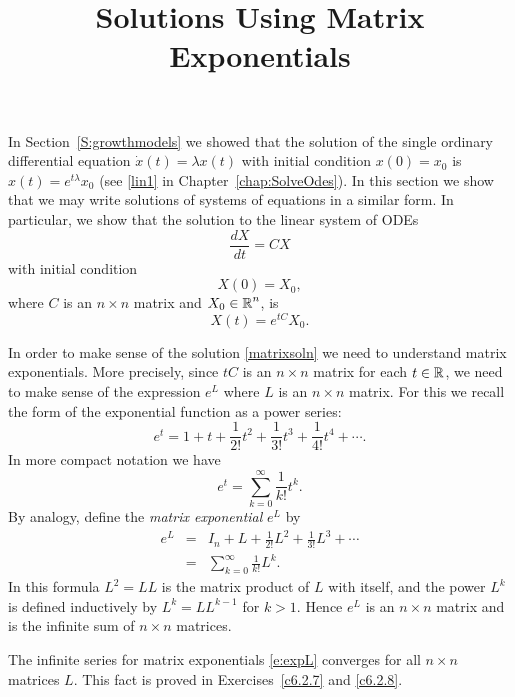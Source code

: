\documentclass{ximera}
\title{Solutions Using Matrix Exponentials}
\begin{document}
\begin{abstract}
\end{abstract}
\maketitle


\label{S:Matrixexp} 

In Section~\ref{S:growthmodels} we showed that the solution of the single
ordinary differential equation $\dot x(t) = \lambda x(t)$ with initial
condition $x(0)=x_0$ is $x(t) = e^{t\lambda}x_0$ (see \eqref{lin1} in
Chapter~\ref{chap:SolveOdes}).  In this section we show that we
may write solutions of systems of equations in a similar form.
In particular, we show that the solution to the linear system of ODEs
\begin{equation}   \label{eq:x=Mx}
\frac{dX}{dt} = CX
\end{equation}
with initial condition
\[
X(0) = X_0,
\]
where $C$ is an $n\times n$ matrix and $X_0\in\mbox{$\Bbb{R}$}^n$, is
\begin{equation}  \label{matrixsoln}
X(t) = e^{tC}X_0.
\end{equation}

In order to make sense of the solution \eqref{matrixsoln} we need
to understand matrix exponentials. More precisely, since $tC$ is
an $n\times n$ matrix for each $t\in\mbox{$\Bbb{R}$}$, we need to make sense
of the expression $e^L$ where $L$ is an $n\times n$ matrix.  For
this we recall the form of the exponential function as a power
series:
\[
     e^t = 1 + t + \frac{1}{2!} t^2 + \frac{1}{3!} t^3
     + \frac{1}{4!} t^4 + \cdots .
\]
In more compact notation we have
\[
     e^t = \sum\limits_{k=0}^\infty \frac{1}{k!} t^k.
\]
By analogy, define the {\em matrix exponential\/}
$e^L$ by
\begin{eqnarray}
e^{L} & = & I_n + L + \frac{1}{2!} L^2 + \frac{1}{3!} L^3 +\cdots
\label{e:expL}\\
      & = & \sum\limits_{k=0}^\infty\frac{1}{k!} L^k. \nonumber
\end{eqnarray}
In this formula $L^2 = LL$ is the matrix product of $L$ with itself, and the
power $L^k$ is defined inductively by $L^k = LL^{k-1}$ for $k>1$.  Hence
$e^L$ is an $n\times n$ matrix and is the infinite sum of $n\times n$
matrices.

   The infinite series for matrix exponentials
\eqref{e:expL} converges for all $n\times n$ matrices $L$.  This fact
is proved in Exercises~\ref{c6.2.7} and \ref{c6.2.8}.
\end{document}
